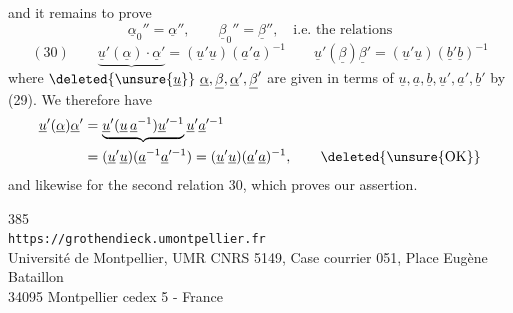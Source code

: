 and it remains to prove
\[
\underline\alpha_0''=\underline\alpha'',\qquad
\underline\beta_0''=\underline\beta'',\quad\text{i.e. the relations}
\]
\[
(30)\qquad
\underbrace{\underline u'(\underline\alpha)\cdot\underline\alpha'}
 =(\underline u'\underline u)(\underline a'\underline a)^{-1}
\qquad
\underline u'(\underline\beta)\underline\beta'
 =(\underline u'\underline u)(\underline b'\underline b)^{-1}
\]
where $\deleted{\unsure{\underline u}}\ \underline\alpha,\underline\beta,\underline\alpha',\underline\beta'$ are given in terms of  $\underline u,\underline a,\underline b,\underline u',\underline a',\underline b'$ by (29). We therefore have
\[
\begin{aligned}
\underline u'(\underline\alpha)\underline\alpha'
 &=\underbrace{\underline u'(\underline u\,\underline a^{-1})\underline u'^{-1}}\underline u'\underline a'^{-1}\\
 &=(\underline u'\underline u)(\underline a^{-1}\underline a'^{-1})
 =(\underline u'\underline u)(\underline a'\underline a)^{-1},
 \qquad\deleted{\text{\unsure{OK}}}
\end{aligned}
\]
 and likewise for the second relation 30, which proves our assertion.
\margin{$\unsure{\checkmark|/}$}

\begin{center}
385\\
\texttt{https://grothendieck.umontpellier.fr}\\
Université de Montpellier, UMR CNRS 5149, Case courrier 051, Place Eugène Bataillon\\
34095 Montpellier cedex 5 - France
\end{center}